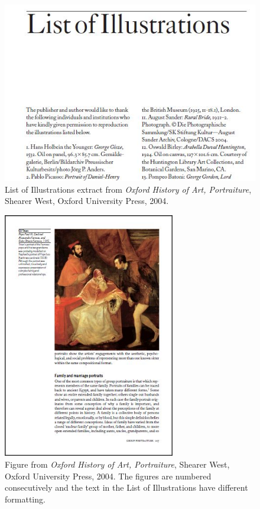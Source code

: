 \begin{figure}[htp]
\includegraphics[width=\textwidth]{./images/listofillustrations.jpg}
\caption{List of Illustrations extract from \textit{Oxford History of Art, Portraiture}, Shearer West, Oxford University Press, 2004.}
\end{figure}
\begin{figure}[htp]
\includegraphics[width=0.67\textwidth]{./images/titian.jpg}
\centering
\caption{Figure from \textit{Oxford History of Art, Portraiture}, Shearer West, Oxford University Press, 2004. The figures are numbered consecutively and the text in the List of Illustrations have different formatting.}
\end{figure}



